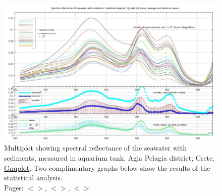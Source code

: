 \documentclass[11pt]{article}
\begin{document}
\begin{figure}[H]
	\centering
	\includegraphics[scale=0.3]{GNU-18-legend.png}
	\caption{Multiplot showing spectral reflectance of the seawater with sediments, measured in aquarium tank, Agia Pelagia district, Crete. \href{http://www.gnuplot.info/}{Gnuplot}. Two complimentary graphs below show the results of the statistical analysis.\\ Pages: $<$\pageref{page-28}$>$, $<$\pageref{dataprep}$>$, $<$\pageref{page-31}$>$}
	\label{fig:4.4}
\end{figure}
\end{document}
